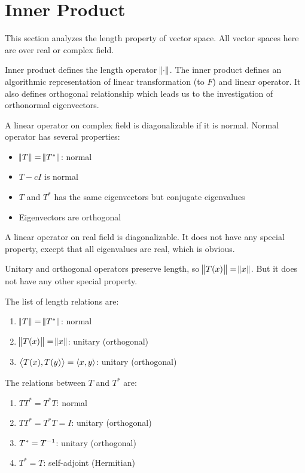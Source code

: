 \chapter{Inner Product}

This section analyzes the length property of vector space. All vector spaces here are over real or complex field.


Inner product defines the length operator $\norm{\cdot}$.
The inner product defines an algorithmic representation of linear transformation (to $F$) and linear operator. It also defines orthogonal relationship which leads us to the investigation of orthonormal eigenvectors.  


A linear operator on complex field is diagonalizable if it is normal. Normal operator has several properties:
\begin{itemize}
    \item $\norm{T} = \norm{T^*}$: normal
    \item $T - c  I$ is normal
    \item $T$ and $T^*$ has the same eigenvectors but conjugate eigenvalues
    \item Eigenvectors are orthogonal
\end{itemize}

A linear operator on real field is diagonalizable. It does not have any special property, except that all eigenvalues are real, which is obvious.

Unitary and orthogonal operators preserve length, so $\norm{T(x)} = \norm{x}$. But it does not have any other special property.

 The list of length relations are:
\begin{enumerate}
    \item $\norm{T} = \norm{T^*}$: normal
    \item $\norm{T(x)} = \norm{x}$: unitary (orthogonal)
    \item $\left\langle \displaystyle T(x), T(y) \right\rangle = \left\langle \displaystyle x, y \right\rangle$: unitary (orthogonal)
\end{enumerate}

The relations between $T$ and $T^*$ are:
\begin{enumerate}
    \item $TT^* = T^*T$: normal
    \item $TT^* = T^*T = I$: unitary (orthogonal)
    \item $T^* = {T}^{-1}$: unitary (orthogonal)
    \item $T^* = T$: self-adjoint (Hermitian)
\end{enumerate}



